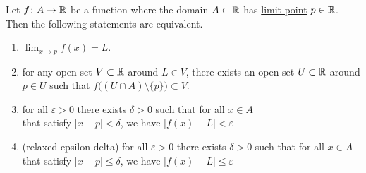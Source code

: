 \documentclass[11pt]{article}
\begin{document}
\begin{proposition}
Let $f\colon A \to \mathbb{R}$ be a function where the domain $A \subset \mathbb{R}$ has \hyperref[pro:ClosedSetsClosedUnderLimitsR]{limit point} $p\in \mathbb{R}$. Then the following statements are equivalent.

\begin{enumerate}
\item $\displaystyle{\lim_{x \to p} f(x) = L}.$
\item for any open set $V \subset \mathbb{R}$ around $L \in V$,
there exists an open set $U \subset \mathbb{R}$ around $p \in U$ such that $f\big((U \cap A) \setminus \{p\} \big) \subset V.$
\item for all $\varepsilon > 0$ there exists $\delta > 0$ such that for all $x \in A$ \\
that satisfy $|x - p|< \delta$, we have $|f(x) - L| < \varepsilon$
\item (relaxed epsilon-delta) for all $\varepsilon > 0$ there exists $\delta > 0$ such that for all $x \in A$ \\
that satisfy $|x - p| \le \delta$, we have $|f(x) - L| \le \varepsilon$
\end{enumerate}
\end{proposition}
\end{document}
